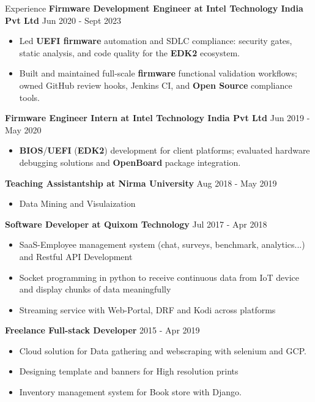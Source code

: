 \documentclass{resume} %
\begin{document}
\begin{rSection}{Experience}
{\textbf{Firmware Development Engineer at Intel Technology India Pvt Ltd}}  \hfill {Jun 2020 - Sept 2023}
\begin{itemize}
    \item Led \textbf{UEFI firmware} automation and SDLC compliance: security gates, static analysis, and code quality for the \textbf{EDK2} ecosystem.
    \item Built and maintained full-scale \textbf{firmware} functional validation workflows; owned GitHub review hooks, Jenkins CI, and \textbf{Open Source} compliance tools.
\end{itemize}

{\textbf{Firmware Engineer Intern at Intel Technology India Pvt Ltd}}  \hfill {Jun 2019 - May 2020}
\begin{itemize}
    \item \textbf{BIOS}/\textbf{UEFI} (\textbf{EDK2}) development for client platforms; evaluated hardware debugging solutions and \textbf{OpenBoard} package integration.
\end{itemize}

{\textbf{Teaching Assistantship at Nirma University}}  \hfill {Aug 2018 - May 2019}
\begin{itemize}
    \item Data Mining and Visulaization
\end{itemize}

{\textbf{Software Developer at Quixom Technology}}   \hfill {Jul 2017 - Apr 2018}
\begin{itemize}
    \item SaaS-Employee management system (chat, surveys, benchmark, analytics...) and Restful API Development
    \item Socket programming in python to receive continuous data from IoT device and display chunks of data meaningfully
    \item Streaming service with Web-Portal, DRF and Kodi across platforms
\end{itemize}

{\textbf{Freelance Full-stack Developer}}   \hfill {2015 - Apr 2019}
\begin{itemize}
    \item Cloud solution for Data gathering and webscraping with selenium and GCP.
    \item Designing template and banners for High resolution prints
    \item Inventory management system for Book store with Django.
\end{itemize}

\end{rSection}
\end{document}
